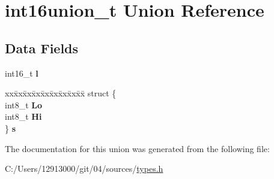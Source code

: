 \hypertarget{unionint16union__t}{}\section{int16union\+\_\+t Union Reference}
\label{unionint16union__t}
\subsection*{Data Fields}
\begin{DoxyCompactItemize}
\item 
\hypertarget{unionint16union__t_ad8a9524a204892ae3d42a2d251ea0643}{}int16\+\_\+t {\bfseries l}\label{unionint16union__t_ad8a9524a204892ae3d42a2d251ea0643}

\item 
\hypertarget{unionint16union__t_a7a0c79a8873c4b3eca57b95574f23b5c}{}\begin{tabbing}
xx\=xx\=xx\=xx\=xx\=xx\=xx\=xx\=xx\=\kill
struct \{\\
\>int8\_t {\bfseries Lo}\\
\>int8\_t {\bfseries Hi}\\
\} {\bfseries s}\label{unionint16union__t_a7a0c79a8873c4b3eca57b95574f23b5c}
\\

\end{tabbing}\end{DoxyCompactItemize}


The documentation for this union was generated from the following file\+:\begin{DoxyCompactItemize}
\item 
C\+:/\+Users/12913000/git/04/sources/\hyperlink{types_8h}{types.\+h}\end{DoxyCompactItemize}
